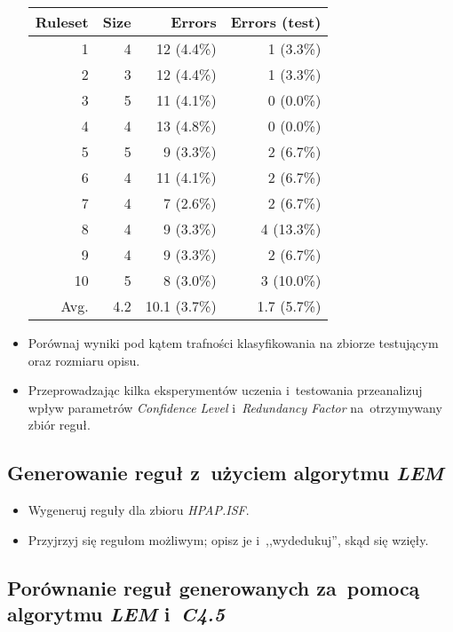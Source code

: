 \documentclass{article}
\begin{document}
\begin{itemize}
\begin{tabular}{|r|r|r|r|}
\hline
 Ruleset & Size & Errors       & Errors (test) \\
\hline\hline
       1 &    4 &   12 (4.4\%) &    1 (3.3\%)  \\
       2 &    3 &   12 (4.4\%) &    1 (3.3\%)  \\
       3 &    5 &   11 (4.1\%) &    0 (0.0\%)  \\
       4 &    4 &   13 (4.8\%) &    0 (0.0\%)  \\
       5 &    5 &    9 (3.3\%) &    2 (6.7\%)  \\
       6 &    4 &   11 (4.1\%) &    2 (6.7\%)  \\
       7 &    4 &    7 (2.6\%) &    2 (6.7\%)  \\
       8 &    4 &    9 (3.3\%) &    4 (13.3\%) \\
       9 &    4 &    9 (3.3\%) &    2 (6.7\%)  \\
      10 &    5 &    8 (3.0\%) &    3 (10.0\%) \\
\hline\hline
    Avg. &  4.2 & 10.1 (3.7\%) &  1.7 (5.7\%)  \\
\hline
\end{tabular}

\item Porównaj wyniki pod kątem trafności klasyfikowania na zbiorze testującym oraz rozmiaru opisu.
\item Przeprowadzając kilka eksperymentów uczenia i~testowania przeanalizuj wpływ parametrów \emph{Confidence Level} i~\emph{Redundancy Factor} na~otrzymywany zbiór reguł.
\end{itemize}

\subsection{Generowanie reguł z~użyciem algorytmu \emph{LEM}}

\begin{itemize}
\item Wygeneruj reguły dla zbioru \emph{HPAP.ISF}.
\item Przyjrzyj się regułom możliwym; opisz je i~,,wydedukuj'', skąd się wzięły.
\end{itemize}

\subsection{Porównanie reguł generowanych za~pomocą algorytmu \emph{LEM} i~\emph{C4.5}}
\end{document}
